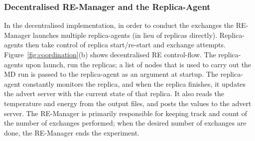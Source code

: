 \documentclass{rspublic}
\newcommand{\jhanote}[1]{ {\textcolor{red} { ***shantenu: #1 }}}
\newcommand{\alnote}[1]{ {\textcolor{blue} { ***andre: #1 }}}
\newcommand{\alnote}[1]{}
\newcommand{\jhanote}[1]{}
\begin{document}

\subsubsection{Decentralised RE-Manager and the Replica-Agent}

 

In the decentralised
implementation, in order to conduct the exchanges the RE-Manager
launches multiple replica-agents (in lieu of replicas directly). 
Replica-agents then take control of replica start/re-start and
exchange attempts.  Figure~\ref{fig:coordination}(b) shows %
decentralised RE control-flow. The replica-agents upon launch, run the replicas;
a list of nodes that is used to carry out the MD run is passed to the
replica-agent as an argument at startup.  The replica-agent constantly
monitors the replica, and when the replica finishes, it updates the
advert server with the current state of that replica.  It also reads
the temperature and energy from the output files, and posts the values
to the advert server.  The RE-Manager is primarily responsible for
keeping track and count of the number of exchanges performed; when the
desired number of exchanges are done, the RE-Manager ends the
experiment.
\end{document}
